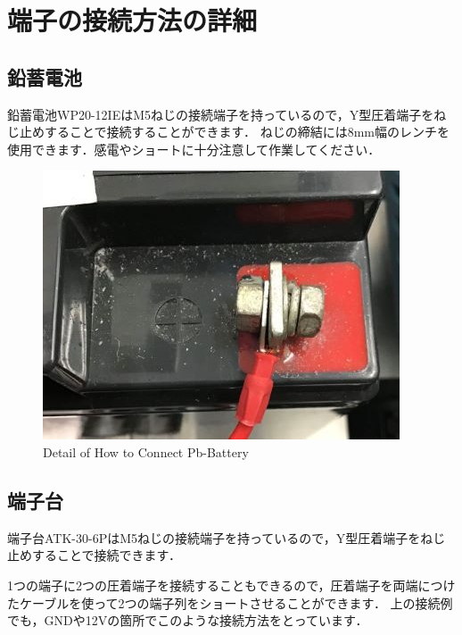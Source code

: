 \documentclass[{../../master}]{subfiles}
\begin{document}
  \section{端子の接続方法の詳細}

  \subsection{鉛蓄電池}
  鉛蓄電池WP20-12IEはM5ねじの接続端子を持っているので，Y型圧着端子をねじ止めすることで接続することができます．  
  ねじの締結には8mm幅のレンチを使用できます．感電やショートに十分注意して作業してください．

  \begin{figure}[ht]
    \centering
    \includegraphics[width=65truemm, clip]{images/pb_battery.jpg}
    \caption{Detail of How to Connect Pb-Battery}
    \label{fig:pb_battery}
  \end{figure}

  \subsection{端子台}
  端子台ATK-30-6PはM5ねじの接続端子を持っているので，Y型圧着端子をねじ止めすることで接続できます．

  1つの端子に2つの圧着端子を接続することもできるので，圧着端子を両端につけたケーブルを使って2つの端子列をショートさせることができます．
  上の接続例でも，GNDや12Vの箇所でこのような接続方法をとっています．
\end{document}
